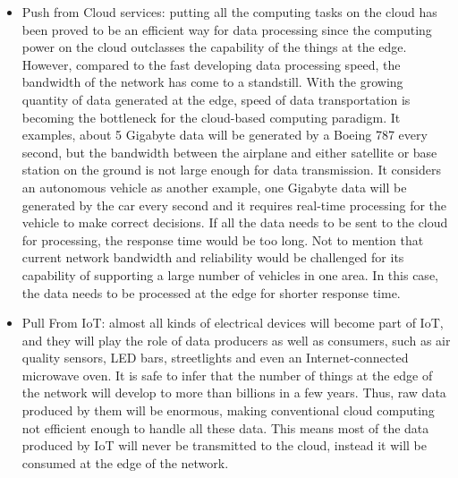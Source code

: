 \begin{itemize}
    
    \item Push from Cloud services: putting all the computing tasks on the cloud has been proved to be an efficient way for data processing since the computing power on the cloud outclasses the capability of the things at the edge. However, compared to the fast developing data processing speed, the bandwidth of the network has come to a standstill. With the growing quantity of data generated at the edge, speed of data transportation is becoming the bottleneck for the cloud-based computing paradigm. It examples, about 5 Gigabyte data will be generated by a Boeing 787 every second, but the bandwidth between the airplane and either satellite or base station on the ground is not large enough for data transmission. It considers an autonomous vehicle as another example, one Gigabyte data will be generated by the car every second and it requires real-time processing for the vehicle to make correct decisions. If all the data needs to be sent to the cloud for processing, the response time would be too long. Not to mention that current network bandwidth and reliability would be challenged for its capability of supporting a large number of vehicles in one area. In  this case, the data needs to be processed at the edge for shorter response time.
    
    \item Pull From IoT: almost all kinds of electrical devices will become part of IoT, and they will play the role of data producers as well as consumers, such as air quality sensors, LED bars, streetlights and even an Internet-connected microwave oven. It is safe to infer that the number of things at the edge of the network will develop to more than billions in a few years. Thus, raw data produced by them will be enormous, making conventional cloud  computing not efficient enough to handle all these data. This means most of the data produced by IoT will never be transmitted to the cloud, instead it will be consumed at the edge of the network.
    

\end{itemize}
